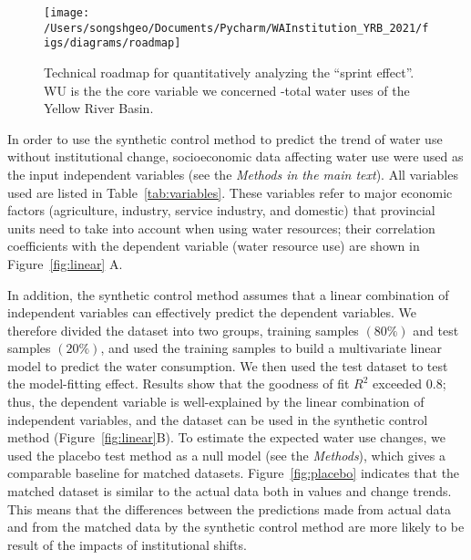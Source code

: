 \documentclass{article}
\begin{document}
\begin{figure}[!hbt]
    \centering
    \texttt{[image: /Users/songshgeo/Documents/Pycharm/WAInstitution\_YRB\_2021/figs/diagrams/roadmap]}
    \caption{
        Technical roadmap for quantitatively analyzing the “sprint effect”. WU is the the core variable we concerned -total water uses of the Yellow River Basin.
    }
    \label{fig:roadmap}
\end{figure}

In order to use the synthetic control method to predict the trend of water use without institutional change, socioeconomic data affecting water use were used as the input independent variables (see the \textit{Methods in the main text}). All variables used are listed in Table~\ref{tab:variables}.
These variables refer to major economic factors (agriculture, industry, service industry, and domestic) that provincial units need to take into account when using water resources; their correlation coefficients with the dependent variable (water resource use) are shown in Figure~\ref{fig:linear} A.

In addition, the synthetic control method assumes that a linear combination of independent variables can effectively predict the dependent variables.
We therefore divided the dataset into two groups, training samples $(80\%)$ and test samples $(20\%)$, and used the training samples to build a multivariate linear model to predict the water consumption. We then used the test dataset to test the model-fitting effect.
Results show that the goodness of fit $R^2$ exceeded $0.8$; thus, the dependent variable is well-explained by the linear combination of independent variables, and the dataset can be used in the synthetic control method (Figure~\ref{fig:linear}B).
To estimate the expected water use changes, we used the placebo test method as a null model (see the \textit{Methods}), which gives a comparable baseline for matched datasets.
Figure~\ref{fig:placebo} indicates that the matched dataset is similar to the actual data both in values and change trends. This means that the differences between the predictions made from actual data and from the matched data by the synthetic control method are more likely to be result of the impacts of institutional shifts.
\end{document}
